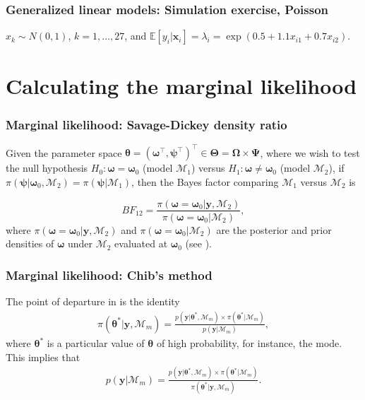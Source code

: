 \documentclass[12pt, compress]{beamer}
\begin{document}
\begin{frame}
	\frametitle{Generalized linear models: Simulation exercise, Poisson}
$x_k\sim N(0, 1)$, $k =1,\dots,27$, and $\mathbb{E}[y_i|\bm{x}_i]=\lambda_i=\exp(0.5+1.1x_{i1}+0.7x_{i2})$.
\end{frame}

\section{Calculating the marginal likelihood}

\begin{frame}
	\frametitle{Marginal likelihood: Savage-Dickey density ratio}
Given the parameter space $\bm{\theta}=(\bm{\omega}^{\top}, \bm{\psi}^{\top})^{\top}\in \bm{\Theta}=\bm{\Omega}\times \bm{\Psi}$, where we wish to test the null hypothesis $H_0:\bm{\omega}=\bm{\omega}_0$ (model $\mathcal{M}_1$) versus $H_1:\bm{\omega}\neq \bm{\omega}_0$ (model $\mathcal{M}_2$), if $\pi(\bm{\psi}|\bm{\omega}_0,\mathcal{M}_2)=\pi(\bm{\psi}|\mathcal{M}_1)$, then the Bayes factor comparing $\mathcal{M}_1$ versus $\mathcal{M}_2$ is

\begin{equation}\label{eq:SD}
	BF_{12}=\frac{\pi(\bm{\omega}=\bm{\omega}_0|\bm{y},\mathcal{M}_2)}{\pi(\bm{\omega}=\bm{\omega}_0|\mathcal{M}_2)},
\end{equation}
where $\pi(\bm{\omega}=\bm{\omega}_0|\bm{y},\mathcal{M}_2)$ and $\pi(\bm{\omega}=\bm{\omega}_0|\mathcal{M}_2)$ are the posterior and prior densities of $\bm{\omega}$ under $\mathcal{M}_2$ evaluated at $\bm{\omega}_0$ (see \cite{verdinelli1995computing}). 
\end{frame}

\begin{frame}
	\frametitle{Marginal likelihood: Chib's method}
The point of departure in \cite{chib1995marginal} is the identity
\begin{align*}	\pi(\bm{\theta}^*|\bm{y},\mathcal{M}_m)=\frac{p(\bm{y}|\bm{\theta}^*,\mathcal{M}_m)\times\pi(\bm{\theta}^*|\mathcal{M}_m)}{p(\bm{y}|\mathcal{M}_m)},
\end{align*} 
where $\bm{\theta}^*$ is a particular value of $\bm{\theta}$ of high probability, for instance, the mode. This implies that
\begin{align*}
p(\bm{y}|\mathcal{M}_m)=\frac{p(\bm{y}|\bm{\theta}^*,\mathcal{M}_m)\times\pi(\bm{\theta}^*|\mathcal{M}_m)}{\pi(\bm{\theta}^*|\bm{y},\mathcal{M}_m)}.
\end{align*} 
 
\end{frame}
\end{document}
